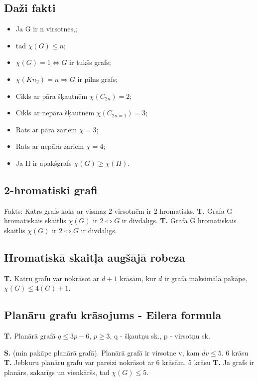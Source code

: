 \documentclass{article}
\begin{document}
\subsection{Daži fakti}
\begin{itemize}
	\item Ja G ir n virsotnes,;
	\item tad $\chi(G ) \le n$;
	\item $\chi(G ) = 1 \Leftrightarrow G$ ir tukšs grafs;
	\item $\chi(Kn_2 ) = n ⇒ G$ ir pilns grafs;
	\item Cikls ar pāra šķautnēm $\chi(C_{2n} ) = 2$;
	\item Cikls ar nepāra šķautnēm $\chi(C_{2n=1}) = 3$;
	\item Rats ar pāra zariem $\chi = 3$;
	\item Rats ar nepāra zariem $\chi = 4$;
	\item Ja H ir apakšgrafs $\chi(G ) \ge \chi(H)$.
\end{itemize} 

\subsection{2-hromatiski grafi}
Fakts: Katrs grafs-koks ar vismaz 2 virsotnēm ir 2-hromatisks.
\textbf{T. }Grafa G hromatiskais skaitlis $\chi(G )$ ir $2 ⇔ G$ ir divdaļīgs.
\textbf{T. }Grafa G hromatiskais skaitlis $\chi(G )$ ir $2 ⇔ G$ ir divdaļīgs.
 
\subsection{Hromatiskā skaitļa augšājā robeza}
\textbf{T. } Katru grafu var nokrāsot ar $d + 1$ krāsām, kur $d$ ir grafa maksimālā pakāpe, $\chi(G ) \le 4(G ) + 1$.

\subsection{Planāru grafu krāsojums - Eilera formula}

\textbf{T.} Planārā grafā $q \le 3p − 6$, $p \ge 3$, q - šķautņu sk., p - virsotņu sk.

\textbf{S. }(min pakāpe planārā grafā). Planārā grafā ir virsotne v, kam $dv \le 5$.
6 krāsu \textbf{T. }Jebkuru planāru grafu var pareizi nokrāsot ar 6 krāsām.
5 krāsu \textbf{T. }Ja grafs ir planārs, sakarīgs un vienkāršs, tad $\chi(G ) \le 5$.
\end{document}
